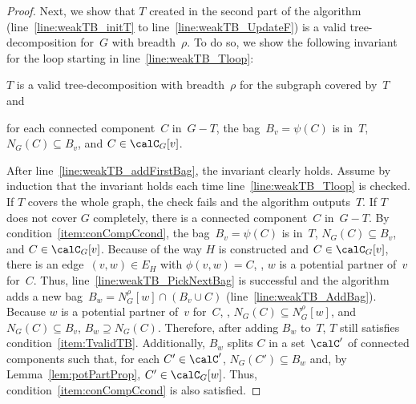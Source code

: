 \begin{proof}
Next, we show that $T$ created in the second part of the algorithm (line~\ref{line:weakTB_initT} to line~\ref{line:weakTB_UpdateF}) is a valid tree-decomposition for~$G$ with breadth~$\rho$.
To do so, we show the following invariant for the loop starting in line~\ref{line:weakTB_Tloop}:
\begin{enumerate*}[(i),mode=unboxed]
    \item
        \label{item:TvalidTB}
        $T$ is a valid tree-decomposition with breadth~$\rho$ for the subgraph covered by~$T$ and
    \item
        \label{item:conCompCcond}
        for each connected component~$C$ in~$G - T$, the bag~$B_v = \psi(C)$ is in~$T$, $N_G(C) \subseteq B_v$, and $C \in \calC_G[v]$.
\end{enumerate*}
After line~\ref{line:weakTB_addFirstBag}, the invariant clearly holds.
Assume by induction that the invariant holds each time line~\ref{line:weakTB_Tloop} is checked.
If $T$ covers the whole graph, the check fails and the algorithm outputs~$T$.
If $T$ does not cover $G$ completely, there is a connected component~$C$ in~$G - T$.
By condition~\ref{item:conCompCcond}, the bag~$B_v = \psi(C)$ is in~$T$, $N_G(C) \subseteq B_v$, and $C \in \calC_G[v]$.
Because of the way $H$ is constructed and $C \in \calC_G[v]$, there is an edge~$(v, w) \in E_H$ with $\phi(v, w) = C$, \ie, $w$ is a potential partner of~$v$ for~$C$.
Thus, line~\ref{line:weakTB_PickNextBag} is successful and the algorithm adds a new bag~$B_w = N_G^\rho[w] \cap (B_v \cup C)$ (line~\ref{line:weakTB_AddBag}).
Because $w$ is a potential partner of~$v$ for~$C$, \ie, $N_G(C) \subseteq N_G^\rho[w]$, and $N_G(C) \subseteq B_v$, $B_w \supseteq N_G(C)$.
Therefore, after adding $B_w$ to~$T$, $T$ still satisfies condition~\ref{item:TvalidTB}.
Additionally, $B_w$ splits $C$ in a set~$\calC'$ of connected components such that, for each $C' \in \calC'$, $N_G(C') \subseteq B_w$ and, by Lemma~\ref{lem:potPartProp}, $C' \in \calC_G[w]$.
Thus, condition~\ref{item:conCompCcond} is also satisfied.
\end{proof}

